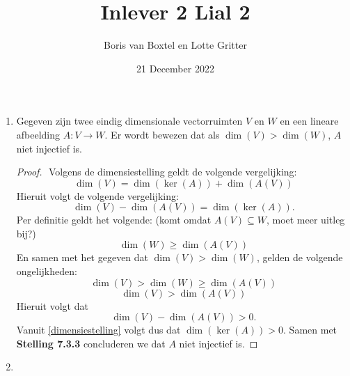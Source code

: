 \documentclass[12pt, dutch, a4paper]{article}
\title{Inlever 2 Lial 2}
\author{Boris van Boxtel en Lotte Gritter}
\date{21 December 2022}
\theoremstyle{definition}
\begin{document}
\maketitle 

\begin{enumerate}
    \item \label{opdracht1}
    Gegeven zijn twee eindig dimensionale vectorruimten 
    $V$ en $W$ en een lineare afbeelding $A\colon V \to W$. 
    Er wordt bewezen dat als $\dim(V) > \dim(W)$, $A$ niet injectief is.
    
    \begin{proof} $ $ \newline
        Volgens de dimensiestelling geldt de volgende vergelijking:
        \begin{equation}
            \dim(V) = \dim(\ker(A)) + \dim(A(V))
        \end{equation}
        Hieruit volgt de volgende vergelijking:
        \begin{equation} \label{dimensiestelling}
            \dim(V) - \dim(A(V)) = \dim(\ker(A)).
        \end{equation}
        Per definitie geldt het volgende: 
        (komt omdat $A(V) \subseteq W$, moet meer uitleg bij?)
        \begin{equation}
            \dim(W) \geq \dim(A(V))
        \end{equation}
        En samen met het gegeven dat $\dim(V) > \dim(W)$,
        gelden de volgende ongelijkheden:
        \begin{equation}
            \dim(V) > \dim(W) \geq \dim(A(V))
        \end{equation}
        \begin{equation}
            \dim(V) > \dim(A(V))
        \end{equation}
        Hieruit volgt dat
        \begin{equation}
            \dim(V) - \dim(A(V)) > 0.
        \end{equation}
        Vanuit \cref{dimensiestelling} volgt dus dat $\dim(\ker(A)) > 0$.
        Samen met \textbf{Stelling 7.3.3} 
        concluderen we dat $A$ niet injectief is. 

    \end{proof}
    
    
    \item \label{opdracht2}


\end{enumerate}
\end{document}
